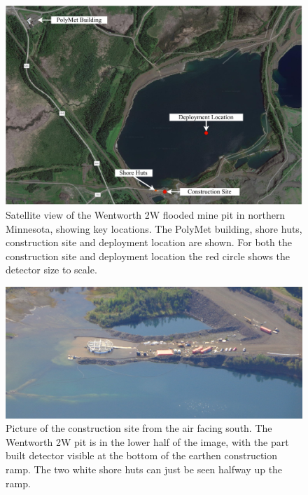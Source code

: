 \begin{figure} %
    \includegraphics[width=\textwidth]{diagrams/4-chips/pit.pdf}
    \caption[Satellite view of the Wentworth 2W mine pit, with key locations.]
    {Satellite view of the Wentworth 2W flooded mine pit in northern Minnesota, showing key
        \chipsfive locations. The PolyMet building, shore huts, construction site and deployment
        location are shown. For both the construction site and deployment location the red circle
        shows the \chipsfive detector size to scale.}
    \label{fig:pit}
\end{figure}

\begin{figure} %
    \includegraphics[width=\textwidth]{diagrams/4-chips/from_the_sky.jpg}
    \caption[Picture of the \chipsfive construction site from the air.]
    {Picture of the \chipsfive construction site from the air facing south. The Wentworth 2W pit
        is in the lower half of the image, with the part built \chipsfive detector visible at the
        bottom of the earthen construction ramp. The two white shore huts can just be seen halfway
        up the ramp.}
    \label{fig:from_the_sky}
\end{figure}

